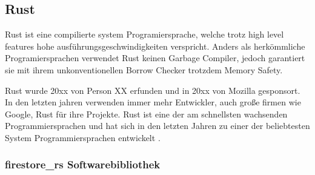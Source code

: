 \subsection{Rust}

Rust ist eine compilierte system Programiersprache, welche trotz high level features hohe ausführungsgeschwindigkeiten verspricht. Anders als herkömmliche Programiersprachen verwendet Rust keinen Garbage Compiler, jedoch garantiert sie mit ihrem unkonventionellen Borrow Checker trotzdem Memory Safety.


Rust wurde 20xx von Person XX erfunden und in 20xx von Mozilla gesponsort. In den letzten jahren verwenden immer mehr Entwickler, auch große firmen wie Google, Rust für ihre Projekte. Rust ist eine der am schnellsten wachsenden Programmiersprachen und hat sich in den letzten Jahren zu einer der beliebtesten System Programmiersprachen entwickelt \cite{stackoverflow_survey}.

\subsubsection{firestore\_rs Softwarebibliothek}
